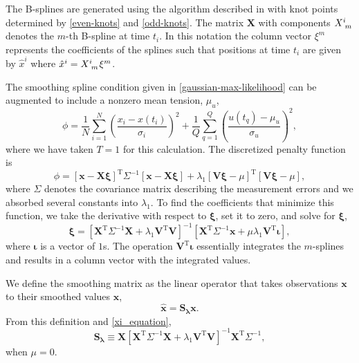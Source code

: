 \documentclass{ametsoc}
\begin{document}
The B-splines are generated using the algorithm described in \citet{deboor1978-book} with knot points determined by  \eqref{even-knots} and \eqref{odd-knots}. The matrix $\mathbf{X}$ with components $X\indices{^i_m}$ denotes the $m$-th B-spline at time $t_i$. In this notation the column vector $\xi^m$ represents the coefficients of the splines such that positions at time $t_i$ are given by $\hat{x}^i$ where $\hat{x}^i =  X\indices{^i_m} \xi^m$.

The smoothing spline condition given in \eqref{gaussian-max-likelihood} can be augmented to include a nonzero mean tension, $\mu_u$,
\begin{equation}
\phi =  \frac{1}{N} \sum^N _{i=1}\left( \frac{x_i - x(t_i)}{\sigma_i} \right)^2 + \frac{1}{Q} \sum^{Q}_{q=1}  \left(  \frac{u(t_q)-\mu_u}{\sigma_u} \right)^2,
\end{equation}
where we have taken $T=1$ for this calculation. The discretized penalty function is
\begin{equation}
\phi = \left[ \mathbf{x} - \mathbf{X} \mathbf{\xi} \right]^{\textrm{T}} \Sigma^{-1} \left[ \mathbf{x} - \mathbf{X} \mathbf{\xi}\right]
+ \lambda_1 \left[\mathbf{V}\mathbf{\xi} - \mu \right]^{\textrm{T}} \left[ \mathbf{V}\mathbf{\xi} - \mu \right],
\end{equation}
where $\Sigma$ denotes the covariance matrix describing the measurement errors and we absorbed several constants into $\lambda_1$. To find the coefficients that minimize this function, we take the derivative with respect to $\mathbf{\xi}$, set it to zero, and solve for $\mathbf{\xi}$,
\begin{equation}
\label{xi_equation}
\mathbf{\xi} = \left[ \mathbf{X}^{\textrm{T}} \Sigma^{-1} \mathbf{X} + \lambda_1 \mathbf{V}^{\textrm{T}} \mathbf{V} \right]^{-1}   \left[ \mathbf{X}^{\textrm{T}} \Sigma^{-1} \mathbf{x} +  \mu \lambda_1 \mathbf{V}^{\textrm{T}} \mathbf{\iota} \right],
\end{equation}
where $\mathbf{\iota}$ is a vector of $1$s. The operation $\mathbf{V}^{\textrm{T}} \mathbf{\iota}$ essentially integrates the $m$-splines and results in a column vector with the integrated values.

We define the smoothing matrix as the linear operator that takes observations $\mathbf{x}$ to their smoothed values $\mathbf{\hat{x}}$,
\begin{equation}
\mathbf{\hat{x}} = \mathbf{S_\lambda} \mathbf{x}.
\end{equation}
From this definition and \eqref{xi_equation},
\begin{equation}
\label{smoothing-operator}
\mathbf{S_\lambda} \equiv \mathbf{X} \left[ \mathbf{X}^{\textrm{T}} \Sigma^{-1} \mathbf{X} + \lambda_1 \mathbf{V}^{\textrm{T}} \mathbf{V} \right]^{-1} \mathbf{X}^{\textrm{T}} \Sigma^{-1},
\end{equation}
when $\mu=0$.
\end{document}
